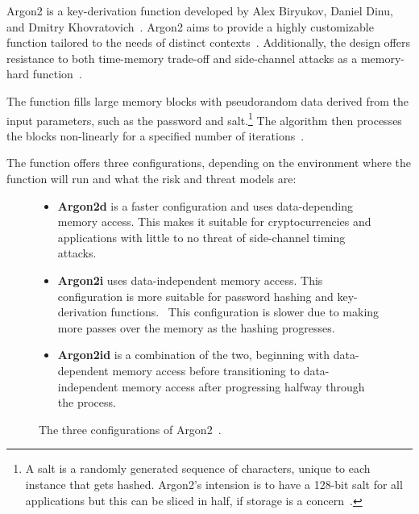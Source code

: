 Argon2 is a key-derivation function developed by Alex Biryukov, Daniel Dinu,
and Dmitry Khovratovich~\cite{argon2specs}.
Argon2 aims to provide a highly customizable function
tailored to the needs of distinct contexts~\cite{argon2specs}.
Additionally, the design offers resistance to both time-memory trade-off and
side-channel attacks as a memory-hard function~\cite{argon2specs}.

The function fills large memory blocks with pseudorandom data derived from the
input parameters, such as the password and salt.\footnote{
  A salt is a randomly generated sequence of characters, unique to each instance
  that gets hashed. Argon2's intension is to have a 128-bit salt for all
  applications but this can be sliced in half, if storage is a
  concern~\cite{argon2specs}.
}
The algorithm then processes the blocks non-linearly for a specified number of
iterations~\cite{argon2specs}.

The function offers three configurations, depending on the environment where the
function will run and what the risk and threat models are:

\begin{figure}[htbp]
  \centering
  \begin{itemize}
    \item \textbf{Argon2d} is a faster configuration and uses data-depending
    memory access.
    This makes it suitable for cryptocurrencies and applications with little to
    no threat of side-channel timing attacks.\protect\footnotemark
    \item \textbf{Argon2i} uses data-independent memory access.
    This configuration is more suitable for password hashing and key-derivation
    functions.\protect\footnotemark
    ~This configuration is slower due to making more passes over the memory as
    the hashing progresses.
    \item \textbf{Argon2id} is a combination of the two, beginning with
    data-dependent memory access before transitioning to data-independent
    memory access after progressing halfway through the process.
  \end{itemize}
  \caption{The three configurations of Argon2~\cite{argon2specs}.}
  \label{fig:argon2conf}
\end{figure}


